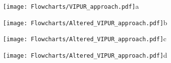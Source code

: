 	\begin{figure}[!ht]
		\centering
		\begin{subfigure}{0.45\textwidth}
			\texttt{[image: Flowcharts/VIPUR\_approach.pdf]}{a}
			\label{fig:RES_}
		\end{subfigure}
		\begin{subfigure}{0.45\textwidth}
			\texttt{[image: Flowcharts/Altered\_VIPUR\_approach.pdf]}{b}
			\label{fig:RES_}
		\end{subfigure}
		\begin{subfigure}{0.45\textwidth}
			\texttt{[image: Flowcharts/Altered\_VIPUR\_approach.pdf]}{c}
			\label{fig:RES_}
		\end{subfigure}
		\begin{subfigure}{0.45\textwidth}
			\texttt{[image: Flowcharts/Altered\_VIPUR\_approach.pdf]}{d}
			\label{fig:RES_}
		\end{subfigure}
		\caption[I-TASSER and Robetta models with and without templates]{}



	\label{subsubsec:RES_Expanding_Models}




\end{figure}
